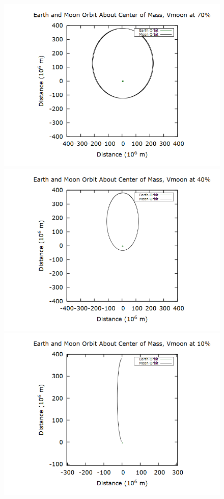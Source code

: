 \documentclass[aps,prl,twocolumn,superscriptaddress]{revtex4-1}
\begin{document}
\begin{figure}[htbp]
  	\begin{center}
 		\includegraphics[scale=0.3]{emmoon70.png}
 		\includegraphics[scale=0.3]{emmoon40.png}
 		\includegraphics[scale=0.3]{emmoon10.png}

\end{center}
\end{figure}
\end{document}
